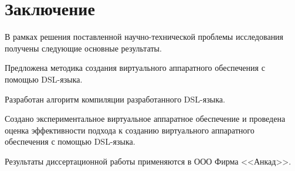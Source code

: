 \chapter*{Заключение}                       %



В рамках решения поставленной научно-технической проблемы исследования
получены следующие основные результаты.

Предложена методика создания виртуального аппаратного обеспечения с
помощью DSL-языка.

Разработан алгоритм компиляции разработанного DSL-языка.

Создано экспериментальное виртуальное аппаратное обеспечение
и проведена оценка эффективности подхода к созданию
виртуального аппаратного обеспечения с помощью DSL-языка.

Результаты диссертационной работы применяются в ООО Фирма <<Анкад>>.
